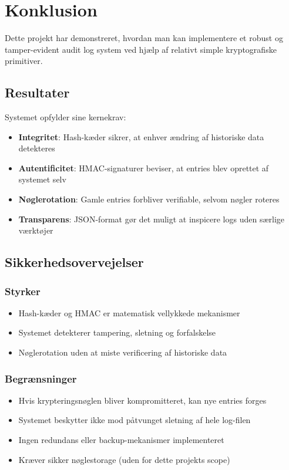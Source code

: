 \documentclass[12pt, a4paper, danish]{article}
\begin{document}
\newpage
\section{Konklusion}

Dette projekt har demonstreret, hvordan man kan implementere et robust og tamper-evident audit log system ved hjælp af relativt simple kryptografiske primitiver.

\subsection{Resultater}

Systemet opfylder sine kernekrav:
\begin{itemize}
    \item \textbf{Integritet}: Hash-kæder sikrer, at enhver ændring af historiske data detekteres
    \item \textbf{Autentificitet}: HMAC-signaturer beviser, at entries blev oprettet af systemet selv
    \item \textbf{Nøglerotation}: Gamle entries forbliver verifiable, selvom nøgler roteres
    \item \textbf{Transparens}: JSON-format gør det muligt at inspicere logs uden særlige værktøjer
\end{itemize}

\subsection{Sikkerhedsovervejelser}

\subsubsection{Styrker}
\begin{itemize}
    \item Hash-kæder og HMAC er matematisk vellykkede mekanismer
    \item Systemet detekterer tampering, sletning og forfalskelse
    \item Nøglerotation uden at miste verificering af historiske data
\end{itemize}

\subsubsection{Begrænsninger}
\begin{itemize}
    \item Hvis krypteringsnøglen bliver kompromitteret, kan nye entries forges
    \item Systemet beskytter ikke mod påtvunget sletning af hele log-filen
    \item Ingen redundans eller backup-mekanismer implementeret
    \item Kræver sikker nøglestorage (uden for dette projekts scope)
\end{itemize}
\end{document}
